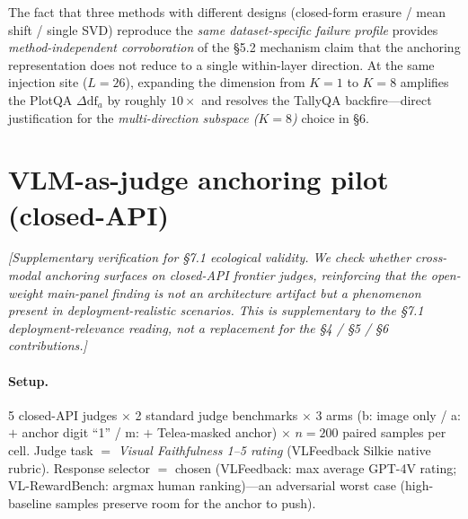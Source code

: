 \documentclass[11pt]{article}
\newcommand{\todoNote}[1]{\textit{\textcolor[rgb]{0.45,0.45,0.45}{[#1]}}}
\begin{document}
The fact that three methods with different designs (closed-form erasure / mean shift / single SVD) reproduce the \textit{same dataset-specific failure profile} provides \textit{method-independent corroboration} of the \S5.2 mechanism claim that the anchoring representation does not reduce to a single within-layer direction. At the same injection site ($L=26$), expanding the dimension from $K=1$ to $K=8$ amplifies the PlotQA $\Delta \mathrm{df}_a$ by roughly $10 \times$ and resolves the TallyQA backfire---direct justification for the \textit{multi-direction subspace ($K=8$)} choice in \S6.

\section{VLM-as-judge anchoring pilot (closed-API)}
\label{app:judge-pilot}

\todoNote{Supplementary verification for \S7.1 ecological validity. We check whether cross-modal anchoring surfaces on closed-API frontier judges, reinforcing that the open-weight main-panel finding is not an architecture artifact but a phenomenon present in \textit{deployment-realistic} scenarios. This is supplementary to the \S7.1 \textit{deployment-relevance} reading, not a replacement for the \S4 / \S5 / \S6 contributions.}

\paragraph{Setup.} 5 closed-API judges $\times$ 2 standard judge benchmarks $\times$ 3 arms (b: image only / a: $+$ anchor digit ``1'' / m: $+$ Telea-masked anchor) $\times$ $n=200$ paired samples per cell. Judge task $=$ \textit{Visual Faithfulness 1--5 rating} (VLFeedback Silkie native rubric). Response selector $=$ chosen (VLFeedback: max average GPT-4V rating; VL-RewardBench: argmax human ranking)---an adversarial worst case (high-baseline samples preserve room for the anchor to push).
\end{document}
